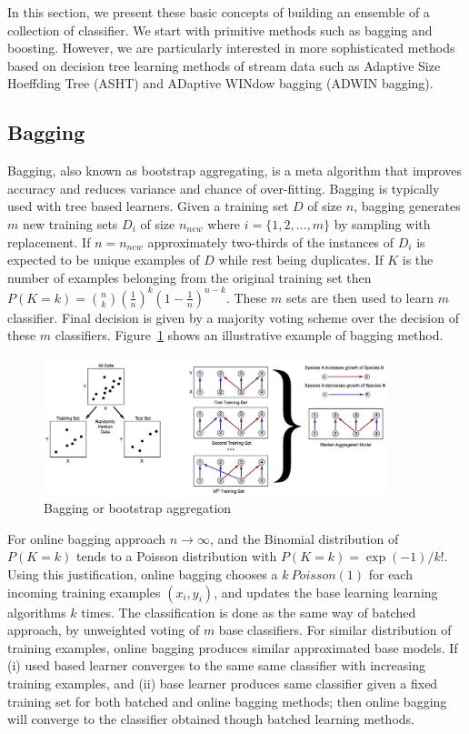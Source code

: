 In this section, we present these basic concepts of building an ensemble of a collection of classifier. We start with primitive methods such as bagging and boosting. However, we are particularly interested in more sophisticated methods based on decision tree learning methods of stream data such as Adaptive Size Hoeffding Tree (ASHT) and ADaptive WINdow bagging (ADWIN bagging).

\subsection{Bagging}
\label{sec:bg:bagging}
Bagging, also known as bootstrap aggregating, is a meta algorithm that improves accuracy and reduces variance and chance of over-fitting. Bagging is typically used with tree based learners. Given a training set $D$ of size $n$, bagging generates $m$ new training sets $D_i$ of size $n_{new}$ where $i = \{1, 2, \dots, m\}$ by sampling with replacement. If $n = n_{new}$ approximately two-thirds of the instances of $D_i$ is expected to be unique examples of $D$ while rest being duplicates. If $K$ is the number of examples belonging from the original training set then $P(K=k) = \binom{n}{k} \left( \frac{1}{n}\right)^k \left(1- \frac{1}{n}\right)^{n-k}$. These $m$ sets are then used to learn $m$ classifier. Final decision is given by a majority voting scheme over the decision of these $m$ classifiers. Figure~\ref{fig:bg:bagging} shows an illustrative example of bagging method.
\begin{figure}[htbp]
    \begin{center}
        \includegraphics[width=10.0cm]{figs/bagging.jpg}
        \caption{Bagging or bootstrap aggregation}
        \label{fig:bg:bagging}
    \end{center}
\end{figure}

For online bagging approach $n \rightarrow \infty$, and the Binomial distribution of $P(K=k)$ tends to a Poisson distribution with $P(K=k) = \exp(-1)/k!$. Using this justification, online bagging chooses a $k ~ Poisson(1)$ for each incoming training examples $(x_i, y_i)$, and updates the base learning learning algorithms $k$ times. The classification is done as the same way of batched approach, by unweighted voting of $m$ base classifiers. For similar distribution of training examples, online bagging produces similar approximated base models. If (i) used based learner converges to the same same classifier with increasing training examples, and (ii) base learner produces same classifier given a fixed training set for both batched and online bagging methods; then online bagging will converge to the classifier obtained though batched learning methods.


